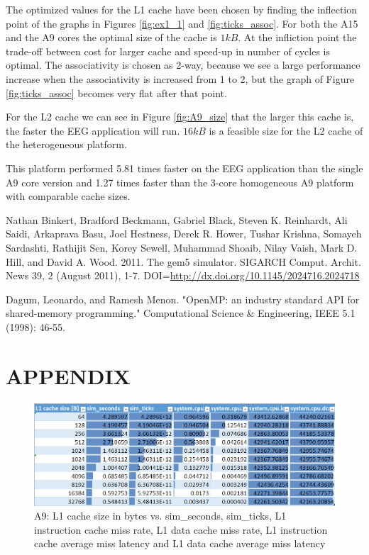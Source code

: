 \documentclass[a4paper, 10pt, conference]{ieeeconf}      %
\begin{document}
The optimized values for the L1 cache have been chosen by finding the inflection point of the graphs in Figures \ref{fig:ex1_1} and \ref{fig:ticks_assoc}. For both the A15 and the A9 cores the optimal size of the cache is $1kB$. At the infliction point the trade-off between cost for larger cache and speed-up in number of cycles is optimal. The associativity is chosen as 2-way, because we see a large performance increase when the associativity is increased from 1 to 2, but the graph of Figure \ref{fig:ticks_assoc} becomes very flat after that point.

For the L2 cache we can see in Figure \ref{fig:A9_size} that the larger this cache is, the faster the EEG application will run. $16kB$ is a feasible size for the L2 cache of the heterogeneous platform.

This platform performed 5.81 times faster on the EEG application than the single A9 core version and 1.27 times faster than the 3-core homogeneous A9 platform with comparable cache sizes.



\begin{thebibliography}{99}

 Nathan Binkert, Bradford Beckmann, Gabriel Black, Steven K. Reinhardt, Ali Saidi, Arkaprava Basu, Joel Hestness, Derek R. Hower, Tushar Krishna, Somayeh Sardashti, Rathijit Sen, Korey Sewell, Muhammad Shoaib, Nilay Vaish, Mark D. Hill, and David A. Wood. 2011. The gem5 simulator. SIGARCH Comput. Archit. News 39, 2 (August 2011), 1-7. DOI=\url{http://dx.doi.org/10.1145/2024716.2024718}

 Dagum, Leonardo, and Ramesh Menon. "OpenMP: an industry standard API for shared-memory programming." Computational Science \& Engineering, IEEE 5.1 (1998): 46-55.



\end{thebibliography}






\onecolumn
\section*{APPENDIX}

\begin{figure}[thpb]
\centering
\includegraphics[scale=0.7]{Figures/assignment1_1_table.png}
\caption{A9: L1 cache size in bytes vs. sim\_seconds, sim\_ticks, L1 instruction cache miss rate, L1 data cache miss rate, L1 instruction cache average miss latency and L1 data cache average miss latency}
\label{Afigure1_1}
\end{figure}
\end{document}
